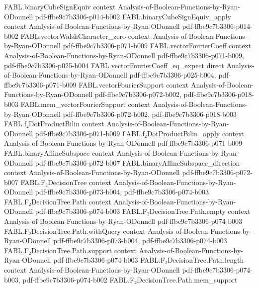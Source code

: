 \begin{theorem}
\proofstep
  {FABL.binaryCubeSignEquiv}
  {context}
  {Analysis-of-Boolean-Functions-by-Ryan-ODonnell}
  {pdf-ffbe9c7b3306-p014-b002}
\proofstep
  {FABL.binaryCubeSignEquiv_apply}
  {context}
  {Analysis-of-Boolean-Functions-by-Ryan-ODonnell}
  {pdf-ffbe9c7b3306-p014-b002}
\proofstep
  {FABL.vectorWalshCharacter_zero}
  {context}
  {Analysis-of-Boolean-Functions-by-Ryan-ODonnell}
  {pdf-ffbe9c7b3306-p071-b009}
\proofstep
  {FABL.vectorFourierCoeff}
  {context}
  {Analysis-of-Boolean-Functions-by-Ryan-ODonnell}
  {pdf-ffbe9c7b3306-p071-b009,
    pdf-ffbe9c7b3306-p025-b004}
\proofstep
  {FABL.vectorFourierCoeff_eq_expect}
  {direct}
  {Analysis-of-Boolean-Functions-by-Ryan-ODonnell}
  {pdf-ffbe9c7b3306-p025-b004,
    pdf-ffbe9c7b3306-p071-b009}
\proofstep
  {FABL.vectorFourierSupport}
  {context}
  {Analysis-of-Boolean-Functions-by-Ryan-ODonnell}
  {pdf-ffbe9c7b3306-p072-b002,
    pdf-ffbe9c7b3306-p018-b003}
\proofstep
  {FABL.mem_vectorFourierSupport}
  {context}
  {Analysis-of-Boolean-Functions-by-Ryan-ODonnell}
  {pdf-ffbe9c7b3306-p072-b002,
    pdf-ffbe9c7b3306-p018-b003}
\proofstep
  {FABL.f₂DotProductBilin}
  {context}
  {Analysis-of-Boolean-Functions-by-Ryan-ODonnell}
  {pdf-ffbe9c7b3306-p071-b009}
\proofstep
  {FABL.f₂DotProductBilin_apply}
  {context}
  {Analysis-of-Boolean-Functions-by-Ryan-ODonnell}
  {pdf-ffbe9c7b3306-p071-b009}
\proofstep
  {FABL.binaryAffineSubspace}
  {context}
  {Analysis-of-Boolean-Functions-by-Ryan-ODonnell}
  {pdf-ffbe9c7b3306-p072-b007}
\proofstep
  {FABL.binaryAffineSubspace_direction}
  {context}
  {Analysis-of-Boolean-Functions-by-Ryan-ODonnell}
  {pdf-ffbe9c7b3306-p072-b007}
\proofstep
  {FABL.F₂DecisionTree}
  {context}
  {Analysis-of-Boolean-Functions-by-Ryan-ODonnell}
  {pdf-ffbe9c7b3306-p073-b004,
    pdf-ffbe9c7b3306-p074-b003}
\proofstep
  {FABL.F₂DecisionTree.Path}
  {context}
  {Analysis-of-Boolean-Functions-by-Ryan-ODonnell}
  {pdf-ffbe9c7b3306-p074-b003}
\proofstep
  {FABL.F₂DecisionTree.Path.empty}
  {context}
  {Analysis-of-Boolean-Functions-by-Ryan-ODonnell}
  {pdf-ffbe9c7b3306-p074-b003}
\proofstep
  {FABL.F₂DecisionTree.Path.withQuery}
  {context}
  {Analysis-of-Boolean-Functions-by-Ryan-ODonnell}
  {pdf-ffbe9c7b3306-p073-b004,
    pdf-ffbe9c7b3306-p074-b003}
\proofstep
  {FABL.F₂DecisionTree.Path.support}
  {context}
  {Analysis-of-Boolean-Functions-by-Ryan-ODonnell}
  {pdf-ffbe9c7b3306-p074-b003}
\proofstep
  {FABL.F₂DecisionTree.Path.length}
  {context}
  {Analysis-of-Boolean-Functions-by-Ryan-ODonnell}
  {pdf-ffbe9c7b3306-p074-b003,
    pdf-ffbe9c7b3306-p074-b002}
\proofstep
  {FABL.F₂DecisionTree.Path.mem_support}

\end{theorem}
